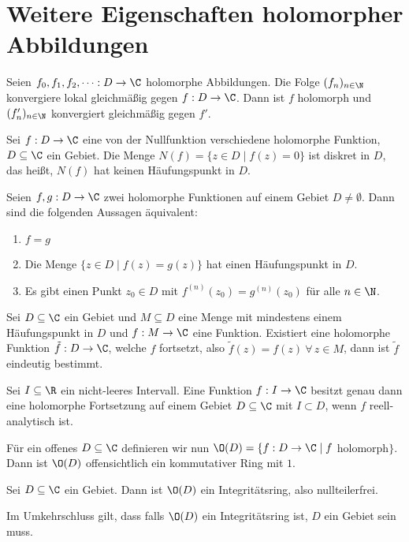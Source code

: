 \section[Weitere Eigenschaften]{Weitere Eigenschaften holomorpher Abbildungen}\lecture
		
		\begin{thm}[Weierstraß, 1841]\label{2.5.1}
			Seien $ f_0,f_1,f_2,\dots: D \to \C $ holomorphe Abbildungen. Die Folge $ (f_n)_{n \in  \N} $ konvergiere lokal gleichmäßig gegen $f: D \to \C$. Dann ist $f$ holomorph und $ (f'_n)_{n \in \N} $ konvergiert gleichmäßig gegen $f'$.
		\end{thm}
		
		\begin{thm}
			Sei $f: D \to \C$ eine von der Nullfunktion verschiedene holomorphe Funktion, $D \subseteq \C$ ein Gebiet. Die Menge $N(f) = \{z \in D \mid f(z) = 0\}$ ist diskret in $D$, das heißt, $N(f)$ hat keinen Häufungspunkt in $D$. 
		\end{thm}
		
		\begin{corn}
			Seien $f,g: D \to \C$ zwei holomorphe Funktionen auf einem Gebiet $ D \neq \emptyset $. Dann sind die folgenden Aussagen äquivalent:
			\begin{enumerate}[label={\roman*})]
				\item $f=g$
				\item Die Menge $ \{z \in D \mid f(z)=g(z)\} $ hat einen Häufungspunkt in $D$.
				\item Es gibt einen Punkt $z_0 \in D$ mit $ f^{(n)}(z_0) = g^{(n)}(z_0) $ für alle $n \in \N$.
			\end{enumerate}
		\end{corn}
		
		\begin{corn}
			Sei $D \subseteq \C$ ein Gebiet und $M \subseteq D$ eine Menge mit mindestens einem Häufungspunkt in $D$ und $f: M \to \C$ eine Funktion. Existiert eine holomorphe Funktion $\tilde{f}: D \to \C$, welche $f$ fortsetzt, also $\tilde{f}(z) = f(z) \ \forall\, z \in M$, dann ist $\tilde{f}$ eindeutig bestimmt.
		\end{corn}
		
		\begin{prop}
			Sei $I \subseteq \R $ ein nicht-leeres Intervall. Eine Funktion $ f: I \to \C $ besitzt genau dann eine holomorphe Fortsetzung auf einem Gebiet $ D \subseteq \C $ mit $ I \subset D $, wenn $f$ reell-analytisch ist.
		\end{prop}
		
		Für ein offenes $D \subseteq \C$ definieren wir nun $ \O(D) = \{ f: D \to \C \mid f $ holomorph$ \} $. Dann ist $ \O(D) $ offensichtlich ein kommutativer Ring mit $1$.
			
		\begin{prop}
			Sei $D \subseteq \C$ ein Gebiet. Dann ist $\O(D)$ ein Integritätsring, also nullteilerfrei.
		\end{prop}
		
		\begin{cor*}
			Im Umkehrschluss gilt, dass falls $\O(D)$ ein Integritätsring ist, $D$ ein Gebiet sein muss.
		\end{cor*}